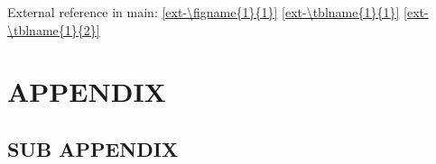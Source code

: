 \documentclass[12pt, lettersize]{article}
\begin{document}

\newpage



\newpage





External reference in main:
\ref{ext-\figname{1}{1}}
\ref{ext-\tblname{1}{1}}
\ref{ext-\tblname{1}{2}}

\newpage
\printbibliography


\newpage
\appendix
\section{APPENDIX}
\lipsum[1]

\subsection{SUB APPENDIX}
\lipsum[1-2]

\end{document}
